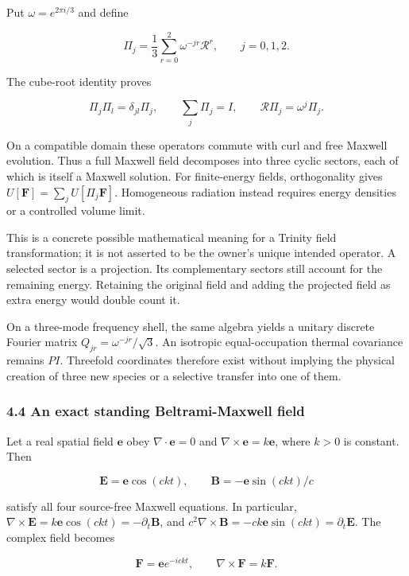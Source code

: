 \documentclass[
  11pt,
]{article}
\begin{document}
Put \(\omega=e^{2\pi i/3}\) and define

\[
\Pi_j=\frac13\sum_{r=0}^{2}\omega^{-jr}\mathcal R^r,
\qquad j=0,1,2.
\]

The cube-root identity proves

\[
\Pi_j\Pi_l=\delta_{jl}\Pi_j,\qquad
\sum_j\Pi_j=I,\qquad
\mathcal R\Pi_j=\omega^j\Pi_j.
\]

On a compatible domain these operators commute with curl and free
Maxwell evolution. Thus a full Maxwell field decomposes into three
cyclic sectors, each of which is itself a Maxwell solution. For
finite-energy fields, orthogonality gives
\(U[\mathbf F]=\sum_jU[\Pi_j\mathbf F]\). Homogeneous radiation instead
requires energy densities or a controlled volume limit.

This is a concrete possible mathematical meaning for a Trinity field
transformation; it is not asserted to be the owner's unique intended
operator. A selected sector is a projection. Its complementary sectors
still account for the remaining energy. Retaining the original field and
adding the projected field as extra energy would double count it.

On a three-mode frequency shell, the same algebra yields a unitary
discrete Fourier matrix \(Q_{jr}=\omega^{-jr}/\sqrt3\). An isotropic
equal-occupation thermal covariance remains \(P I\). Threefold
coordinates therefore exist without implying the physical creation of
three new species or a selective transfer into one of them.

\hypertarget{an-exact-standing-beltrami-maxwell-field}{%
\subsubsection{4.4 An exact standing Beltrami-Maxwell
field}\label{an-exact-standing-beltrami-maxwell-field}}

Let a real spatial field \(\mathbf e\) obey \(\nabla\cdot\mathbf e=0\)
and \(\nabla\times\mathbf e=k\mathbf e\), where \(k>0\) is constant.
Then

\[
\mathbf E=\mathbf e\cos(ckt),\qquad
\mathbf B=-\mathbf e\sin(ckt)/c
\]

satisfy all four source-free Maxwell equations. In particular,
\(\nabla\times\mathbf E=k\mathbf e\cos(ckt)=-\partial_t\mathbf B\), and
\(c^2\nabla\times\mathbf B=-ck\mathbf e\sin(ckt)=\partial_t\mathbf E\).
The complex field becomes

\[
\mathbf F=\mathbf e e^{-ickt},\qquad
\nabla\times\mathbf F=k\mathbf F.
\]
\end{document}
